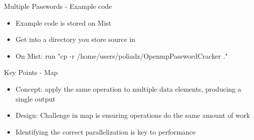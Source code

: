\documentclass[xcolor=dvipsnames]{beamer}
\begin{document}
	\begin{frame}{Multiple Passwords - Example code}
		\begin{itemize}
      \item Example code is stored on Mist
      \item Get into a directory you store source in 
			\item On Mist: run "cp -r /home/users/poliadz/OpenmpPasswordCracker ."
		\end{itemize}
	\end{frame}
  
  \begin{frame}{Key Points - Map}
		\begin{itemize}
      \item Concept: apply the same operation to multiple data elements, producing a single output
      \item Design: Challenge in map is ensuring operations do the same amount of work
			\item Identifying the correct parallelization is key to performance
		\end{itemize}
	\end{frame}
	
\end{document}
